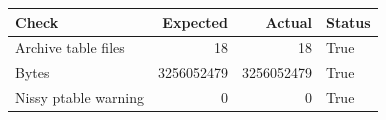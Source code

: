 {\small
\begin{tabular}{lrrl}
\hline
Check & Expected & Actual & Status \\
\hline
Archive table files & 18 & 18 & True \\
Bytes & 3256052479 & 3256052479 & True \\
Nissy ptable warning & 0 & 0 & True \\
\hline
\end{tabular}
}
